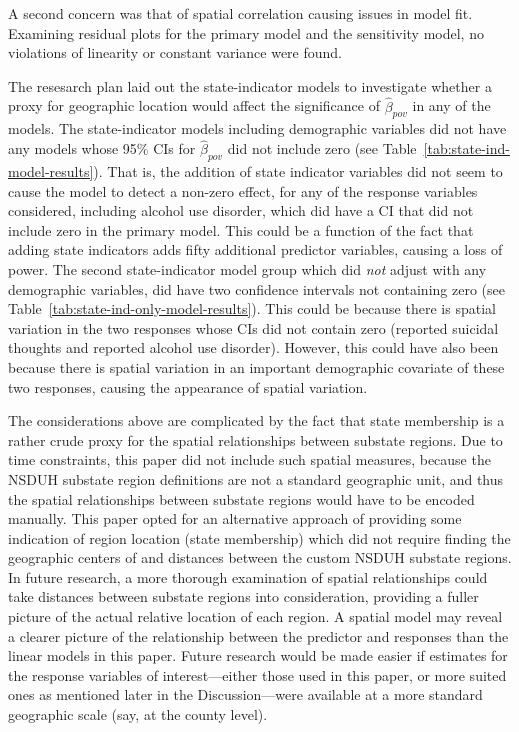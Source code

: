 \documentclass{article}
\begin{document}
A second concern was that of spatial correlation
causing issues in model fit.
Examining residual plots for the primary model
and the sensitivity model,
no violations of linearity
or constant variance were found.

The resesarch plan laid out the state-indicator
models to investigate whether a proxy for geographic
location would affect the significance of
$\hat{\beta}_{pov}$
in any of the models.
The state-indicator models including demographic variables
did not have any models whose 95\% CIs for
$\hat{\beta}_{pov}$
did not include zero
(see Table~\ref{tab:state-ind-model-results}).
That is, the addition of state indicator variables did
not seem to cause the model to detect a non-zero effect,
for any of the response variables considered,
including alcohol use disorder, which did have a
CI that did not include zero in the primary model.
This could be a function of the fact that adding
state indicators adds fifty additional predictor
variables, causing a loss of power.
The second state-indicator model group
which did \textit{not} adjust with any demographic variables,
did have two confidence intervals not containing zero
(see Table~\ref{tab:state-ind-only-model-results}).
This could be because there is spatial variation
in the two responses whose CIs did not contain zero
(reported suicidal thoughts and reported alcohol use disorder).
However, this could have also been because there is
spatial variation in an important demographic covariate of
these two responses, causing the appearance of spatial variation.

The considerations above are complicated by the fact that
state membership is a rather crude proxy for the spatial relationships
between substate regions.
Due to time constraints, this paper did not include such spatial measures,
because the NSDUH substate region definitions
are not a standard geographic unit,
and thus the spatial relationships between substate regions
would have to be encoded manually.
This paper opted for an alternative approach of
providing some indication of region location (state membership)
which did not require finding the geographic centers of
and distances between the custom NSDUH substate regions.
In future research,
a more thorough examination of spatial relationships
could take distances between substate regions into consideration,
providing a fuller picture of the actual relative location
of each region.
A spatial model may reveal a clearer picture of the relationship
between the predictor and responses
than the linear models in this paper.
Future research would be made easier if estimates for
the response variables of interest---either those
used in this paper, or more suited ones as mentioned
later in the Discussion---were available
at a more standard geographic scale
(say, at the county level).
\end{document}
